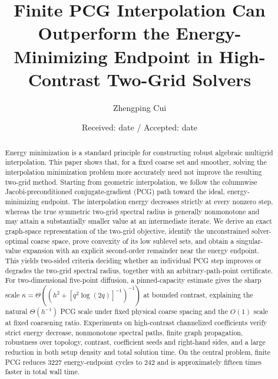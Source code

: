 \documentclass[smallextended]{svjour3}
\title{Finite PCG Interpolation Can Outperform the Energy-Minimizing Endpoint in High-Contrast Two-Grid Solvers}
\author{Zhengping Cui}
\institute{Z. Cui \at Affiliation and e-mail address to be supplied before submission}
\date{Received: date / Accepted: date}
\begin{document}
\maketitle
\begin{abstract}
Energy minimization is a standard principle for constructing robust algebraic multigrid interpolation. This paper shows that, for a fixed coarse set and smoother, solving the interpolation minimization problem more accurately need not improve the resulting two-grid method. Starting from geometric interpolation, we follow the columnwise Jacobi-preconditioned conjugate-gradient (PCG) path toward the ideal, energy-minimizing endpoint. The interpolation energy decreases strictly at every nonzero step, whereas the true symmetric two-grid spectral radius is generally nonmonotone and may attain a substantially smaller value at an intermediate iterate. We derive an exact graph-space representation of the two-grid objective, identify the unconstrained solver-optimal coarse space, prove convexity of its low sublevel sets, and obtain a singular-value expansion with an explicit second-order remainder near the energy endpoint. This yields two-sided criteria deciding whether an individual PCG step improves or degrades the two-grid spectral radius, together with an arbitrary-path-point certificate. For two-dimensional five-point diffusion, a pinned-capacity estimate gives the sharp scale
$\kappa=\Theta((h^2+[q^2\log(2q)]^{-1})^{-1})$ at bounded contrast, explaining the natural $\Theta(h^{-1})$ PCG scale under fixed physical coarse spacing and the $O(1)$ scale at fixed coarsening ratio. Experiments on high-contrast channelized coefficients verify strict energy decrease, nonmonotone spectral paths, finite graph propagation, robustness over topology, contrast, coefficient seeds and right-hand sides, and a large reduction in both setup density and total solution time. On the central problem, finite PCG reduces 3227 energy-endpoint cycles to 242 and is approximately fifteen times faster in total wall time.
\end{abstract}
\end{document}
